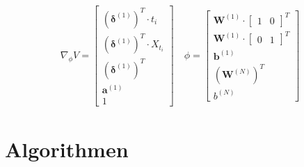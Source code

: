 \documentclass[a4paper, 12pt]{scrartcl}
\begin{document}
\begin{algorithm}
\begin{algorithmic}
        \Return 
        \begin{align*}
            \nabla_\phi V =
            \begin{bmatrix}
                \left(\bm{\delta}^{(1)} \right)^T \cdot t_i \\
                \left(\bm{\delta}^{(1)} \right)^T \cdot X_{t_i}
                \\
                \left(\bm{\delta}^{(1)}\right)^T
                \\
                \bm{a}^{(1)}
                \\
                1
            \end{bmatrix}
            \quad
            \phi
            =
            \begin{bmatrix}
                \bm{W}^{(1)} \cdot \begin{bmatrix} 1 & 0 \end{bmatrix}^T \\
                \bm{W}^{(1)}  \cdot \begin{bmatrix} 0 & 1 \end{bmatrix}^T \\
                \bm{b}^{(1)} \\
                \left(\bm{W}^{(N)}\right)^T \\
                b^{(N)}
            \end{bmatrix}
        \end{align*}
    \end{algorithmic}
\end{algorithm}

\section{Algorithmen}
\end{document}
